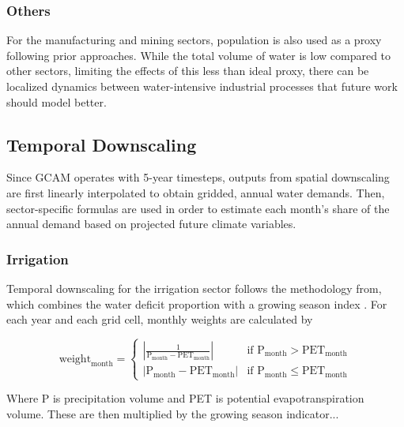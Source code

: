 \documentclass[fleqn,10pt]{wlscirep}
\begin{document}
\subsubsection*{Others}

For the manufacturing and mining sectors, population is also used as a proxy following prior approaches. While the total volume of water is low compared to other sectors, limiting the effects of this less than ideal proxy, there can be localized dynamics between water-intensive industrial processes that future work should model better.

\subsection*{Temporal Downscaling}

Since GCAM operates with 5-year timesteps, outputs from spatial downscaling are first linearly interpolated to obtain gridded, annual water demands. Then, sector-specific formulas are used in order to estimate each month's share of the annual demand based on projected future climate variables.

\subsubsection*{Irrigation}

Temporal downscaling for the irrigation sector follows the methodology from\cite{Moore_2015}, which combines the water deficit proportion \cite{Roy_2005} with a growing season index \cite{Jolly_2005}. For each year and each grid cell, monthly weights are calculated by

\begin{equation}
\text{weight}_\text{month} = \begin{cases}
\left|\frac{1}{\text{P}_\text{month} - \text{PET}_\text{month}}\right| & \text{if } \text{P}_\text{month} > \text{PET}_\text{month} \\
\left|\text{P}_\text{month} - \text{PET}_\text{month}\right| & \text{if } \text{P}_\text{month} \le \text{PET}_\text{month}
\end{cases}
\end{equation}

Where P is precipitation volume and PET is potential evapotranspiration volume. These are then multiplied by the growing season indicator...


\end{document}
